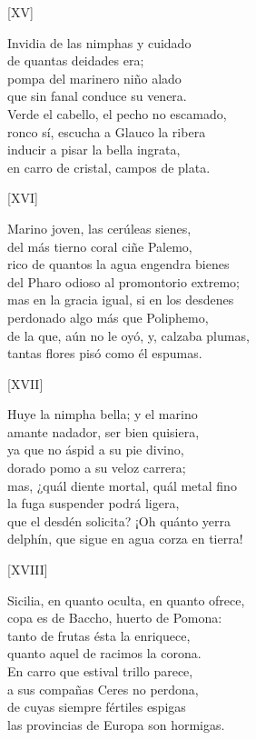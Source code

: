 \documentclass[11pt,a4paper,twoside]{article}
\begin{document}
%
\begin{center}
	[XV]
\end{center}\pstart
Invidia de las nimphas y cuidado\\
de quantas  deidades era;\\
pompa del marinero niño alado\\
que sin fanal conduce su venera.\\
Verde el cabello, el pecho no escamado,\\
ronco sí, escucha a Glauco la ribera\\
inducir a pisar la bella ingrata,\\
en carro de cristal, campos de plata.\par\pend
\relax
\vfill
\newpage
%
\begin{center}
	[XVI]
\end{center}\pstart
Marino joven, las cerúleas sienes,\\
del más tierno coral ciñe Palemo,\\
rico de quantos la agua engendra bienes\\
del Pharo odioso al promontorio extremo;\\
mas en la gracia igual, si en los desdenes\\
perdonado algo más que Poliphemo,\\
de la que, aún no le oyó, y, calzaba plumas,\\
tantas flores pisó como él espumas.\par\pend
%
\begin{center}
	[XVII]
\end{center}\pstart
Huye la nimpha bella; y el marino\\
amante nadador, ser bien quisiera,\\
ya que no áspid a su pie divino,\\
dorado pomo a su veloz carrera;\\
mas, ¿quál diente mortal, quál metal fino\\
la fuga suspender podrá ligera,\\
que el desdén solicita? ¡Oh quánto yerra\\
delphín, que sigue en agua corza en tierra!\par\pend
%
\begin{center}
	[XVIII]
\end{center}\pstart
Sicilia, en quanto oculta, en quanto ofrece,\\
copa es de Baccho, huerto de Pomona:\\
tanto de frutas ésta la enriquece,\\
quanto aquel de racimos la corona.\\
En carro que estival trillo parece,\\
a sus compañas Ceres no perdona,\\
de cuyas siempre fértiles espigas\\
las provincias de Europa son hormigas.\par\pend
\end{document}
